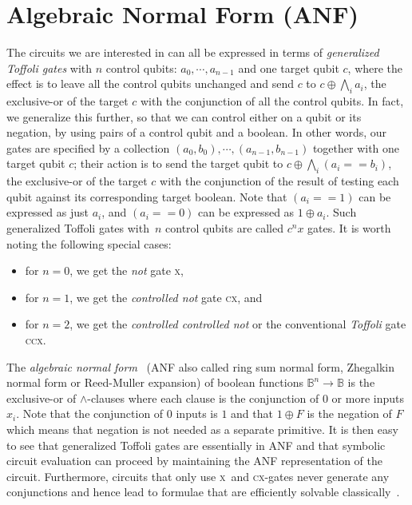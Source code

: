 \documentclass[sigplan,screen]{acmart}
\newcommand{\x}{\textsc{x}}
\newcommand{\cx}{\textsc{cx}}
\newcommand{\ccx}{\textsc{ccx}}
\newcommand{\Bool}{\ensuremath{\mathbb{B}}}
\theoremstyle{definition}
\begin{document}
\section{Algebraic Normal Form (ANF)}
\label{anf}

The circuits we are interested in can all be expressed in terms of
\emph{generalized Toffoli gates} with $n$ control qubits:
$a_0,\cdots,a_{n-1}$ and one target qubit $c$, where the effect is to
leave all the control qubits unchanged and send $c$ to
$c \oplus \bigwedge_i a_i$, the exclusive-or of the target $c$ with
the conjunction of all the control qubits. In fact, we generalize this
further, so that we can control either on a qubit or its negation, by
using pairs of a control qubit and a boolean. In other words, our
gates are specified by a collection $(a_0,b_0),\cdots,(a_{n-1},b_{n-1})$
together with one target qubit $c$; their action is to send the target
qubit to $c \oplus \bigwedge_i \left(a_i == b_i\right)$, the
exclusive-or of the target $c$ with the conjunction of the result of
testing each qubit against its corresponding target boolean. Note that
$\left(a_i == 1\right)$ can be expressed as just $a_i$, and
$\left(a_i == 0\right)$ can be expressed as $1 \oplus a_i$.  Such
generalized Toffoli gates with~$n$ control qubits are called $c^nx$
gates. It is worth noting the following special cases:
\begin{itemize}
  \item for $n=0$, we get the \emph{not} gate \x,
  \item for $n=1$, we get the \emph{controlled not} gate \cx, and
  \item for $n=2$, we get the \emph{controlled controlled not} or the
    conventional \emph{Toffoli} gate \ccx.
\end{itemize}

The \emph{algebraic normal form}~\cite{TOKAREVA20151,10.5555/35517}
(ANF also called ring sum normal form, Zhegalkin normal form or
Reed-Muller expansion) of boolean functions $\Bool^n\rightarrow\Bool$
is the exclusive-or of $\wedge$-clauses where each clause is the
conjunction of 0 or more inputs $x_i$. Note that the conjunction of
$0$ inputs is $1$ and that $1 \oplus F$ is the negation of $F$ which
means that negation is not needed as a separate primitive. It is then
easy to see that generalized Toffoli gates are essentially in ANF and
that symbolic circuit evaluation can proceed by maintaining the ANF
representation of the circuit. Furthermore, circuits that only use \x\
and \cx-gates never generate any conjunctions and hence lead to
formulae that are efficiently solvable
classically~\cite{10.5555/35517,TOKAREVA20151}.
\end{document}
